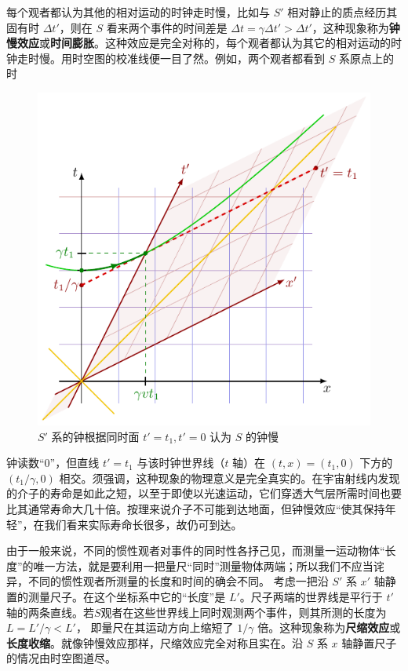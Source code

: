     每个观者都认为其他的相对运动的时钟走时慢，比如与 $S'$ 相对静止的质点经历其固有时 $\Delta t'$，则在 $S$ 看来两个事件的时间差是 $\Delta t=\gamma\Delta t'>\Delta t'$，这种现象称为\textbf{钟慢效应}或\textbf{时间膨胀}。这种效应是完全对称的，每个观者都认为其它的相对运动的时钟走时慢。用时空图的校准线便一目了然。例如，两个观者都看到 $S$ 系原点上的时
    \begin{figure}[ht]
        \centering
        \includegraphics[width=.35\textwidth]{fig/chpt01/INVARIANT HYPERBOLOIDS.pdf}
        \caption{\small $S'$ 系的钟根据同时面 $t'=t_1,t'=0$ 认为 $S$ 的钟慢}
    \end{figure} 
    钟读数“0”，但直线 $t'=t_1$ 与该时钟世界线（$t$ 轴）在 $\left(t,x\right)=(t_1,0)$ 下方的 $(t_1/\gamma,0)$ 相交。须强调，这种现象的物理意义是完全真实的。在宇宙射线内发现的介子的寿命是如此之短，以至于即使以光速运动，它们穿透大气层所需时间也要比其通常寿命大几十倍。按理来说介子不可能到达地面，但钟慢效应“使其保持年轻”，在我们看来实际寿命长很多，故仍可到达。
    
    由于一般来说，不同的惯性观者对事件的同时性各抒己见，而测量一运动物体“长度”的唯一方法，就是要利用一把量尺“同时”测量物体两端；所以我们不应当诧异，不同的惯性观者所测量的长度和时间的确会不同。
    考虑一把沿 $S'$ 系 $x'$ 轴静置的测量尺子。在这个坐标系中它的“长度”是 $L'$。尺子两端的世界线是平行于 $t'$ 轴的两条直线。若$S$观者在这些世界线上同时观测两个事件，则其所测的长度为
    $L= L'/\gamma<L'$，
    即量尺在其运动方向上缩短了 $1/\gamma$ 倍。这种现象称为\textbf{尺缩效应}或\textbf{长度收缩}。就像钟慢效应那样，尺缩效应完全对称且实在。沿 $S$ 系 $x$ 轴静置尺子的情况由时空图道尽。

